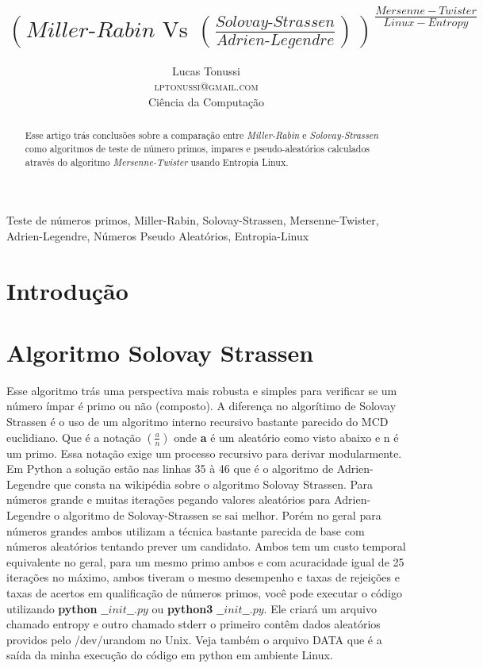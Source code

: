 \documentclass[conference]{IEEEtran}
\title {
$(\textit{Miller-Rabin}\text{ Vs }(\frac{\textit{Solovay-Strassen}}{
  \textit{Adrien-Legendre}}))^{\frac{Mersenne-Twister}{Linux-Entropy}}$
}
\author {
  Lucas Tonussi\\
  \textsc{lptonussi@gmail.com}\\
  \small{Ciência da Computação}
}
\begin{document}
\maketitle

\begin{abstract}
Esse artigo trás conclusões sobre a comparação entre \textit{Miller-Rabin} e
\textit{Solovay-Strassen} como algoritmos de teste de número primos, impares e
pseudo-aleatórios calculados através do algoritmo \textit{Mersenne-Twister}
usando Entropia Linux.
\end{abstract}

\IEEEoverridecommandlockouts

\begin{keywords}
Teste de números primos, Miller-Rabin, Solovay-Strassen, Mersenne-Twister, 
Adrien-Legendre, Números Pseudo Aleatórios, Entropia-Linux
\end{keywords}

\IEEEpeerreviewmaketitle

\section{Introdução}

\section{Algoritmo Solovay Strassen}

Esse algoritmo trás uma perspectiva mais robusta e simples para verificar se um
número ímpar é primo ou não (composto). A diferença no algorítimo de Solovay
Strassen é o uso de um algoritmo interno recursivo bastante parecido do MCD
euclidiano. Que é a notação $(\frac{a}{n})$ onde \textbf{a} é um aleatório como
visto abaixo e n é um primo. Essa notação exige um processo recursivo para
derivar modularmente. Em Python a solução estão nas linhas 35 à 46 que é o
algoritmo de Adrien-Legendre que consta na wikipédia sobre o algoritmo Solovay
Strassen. Para números grande e muitas iterações pegando valores aleatórios para
Adrien-Legendre o algoritmo de Solovay-Strassen se sai melhor. Porém no geral
para números grandes ambos utilizam a técnica bastante parecida de base com
números aleatórios tentando prever um candidato. Ambos tem um custo temporal
equivalente no geral, para um mesmo primo ambos e com acuracidade igual de 25
iterações no máximo, ambos tiveram o mesmo desempenho e taxas de rejeições e
taxas de acertos em qualificação de números primos, você pode executar o código
utilizando \textbf{python} $\_\_init\_\_.py$ ou \textbf{python3}
$\_\_init\_\_.py$. Ele criará um arquivo chamado entropy\cite{dd} e outro
chamado stderr o primeiro contêm dados aleatórios providos pelo
/dev/urandom\cite{dd} no Unix. Veja também o arquivo DATA que é a saída da minha
execução do código em python em ambiente Linux.
\end{document}
